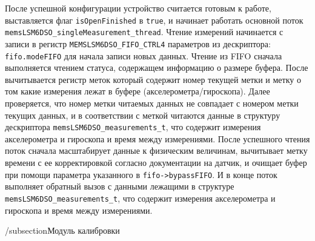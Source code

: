 После успешной конфигурации устройство считается готовым к работе, выставляется флаг \lstinline{isOpenFinished} в \lstinline{true}, и начинает
работать основной поток \lstinline{memsLSM6DSO_singleMeasurement_thread}. Чтение измерений начинается с записи в регистр \lstinline{MEMSLSM6DSO_FIFO_CTRL4}
параметров из дескриптора: \lstinline{fifo.modeFIFO} для начала записи новых данных.
Чтение из FIFO сначала выполняется чтением статуса, содержащем информацию о размере буфера. После вычитывается регистр меток
который содержит номер текущей метки и метку о том какие измерения лежат в буфере (акселерометра/гироскопа). 
Далее проверяется, что номер метки читаемых данных не совпадает с номером метки текущих данных,
и в соответствии с меткой читаются данные в структуру дескриптора \lstinline{memsLSM6DSO_measurements_t}, что содержит измерения акселерометра и гироскопа и время между измерениями.
После успешного чтения поток сначала масштабирует данные к физическим величинам, вычитывает
метку времени с ее корректировкой согласно документации на датчик, и очищает буфер при помощи параметра указанного в \lstinline{fifo->bypassFIFO}.
И в конце поток выполняет обратный вызов с данными лежащими в структуре \lstinline{memsLSM6DSO_measurements_t}, что содержит измерения акселерометра и гироскопа и время между измерениями.

/subsection{Модуль калибровки}
